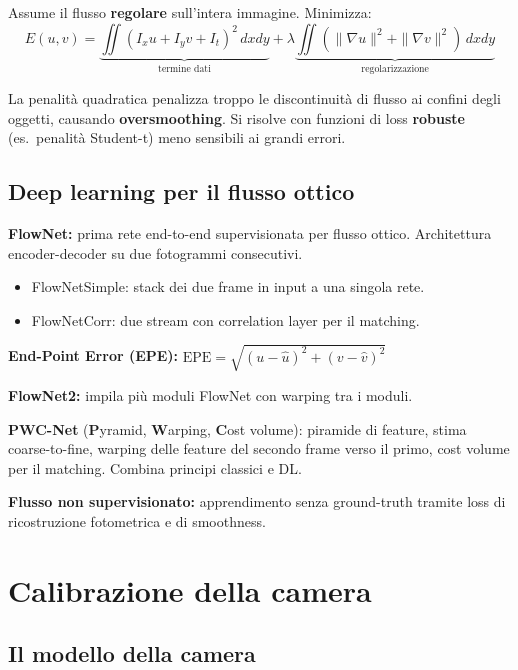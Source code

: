 \documentclass[12pt, a4paper]{report}
\begin{document}
Assume il flusso \textbf{regolare} sull'intera immagine. Minimizza:
\[
  E(u,v)=
  \underbrace{\iint(I_xu+I_yv+I_t)^2\,dxdy}_{\text{termine dati}}+
  \lambda\underbrace{\iint(\|\nabla u\|^2+\|\nabla v\|^2)\,dxdy}_{\text{regolarizzazione}}
\]

\begin{warnbox}[Oversmoothing]
La penalità quadratica penalizza troppo le discontinuità di flusso ai confini
degli oggetti, causando \textbf{oversmoothing}. Si risolve con funzioni di loss
\textbf{robuste} (es.\ penalità Student-t) meno sensibili ai grandi errori.
\end{warnbox}

\section{Deep learning per il flusso ottico}

\textbf{FlowNet:} prima rete end-to-end supervisionata per flusso ottico.
Architettura encoder-decoder su due fotogrammi consecutivi.
\begin{itemize}
  \item FlowNetSimple: stack dei due frame in input a una singola rete.
  \item FlowNetCorr: due stream con correlation layer per il matching.
\end{itemize}

\textbf{End-Point Error (EPE):}
$\mathrm{EPE}=\sqrt{(u-\hat{u})^2+(v-\hat{v})^2}$

\textbf{FlowNet2:} impila più moduli FlowNet con warping tra i moduli.

\textbf{PWC-Net} (\textbf{P}yramid, \textbf{W}arping, \textbf{C}ost volume):
piramide di feature, stima coarse-to-fine, warping delle feature del secondo frame
verso il primo, cost volume per il matching. Combina principi classici e DL.

\textbf{Flusso non supervisionato:} apprendimento senza ground-truth tramite
loss di ricostruzione fotometrica e di smoothness.

\chapter{Calibrazione della camera}

\section{Il modello della camera}
\end{document}
